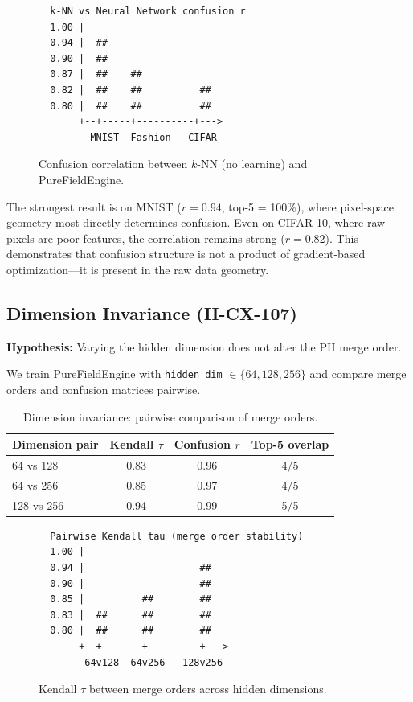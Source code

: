 \documentclass[11pt,a4paper]{article}
\begin{document}
\begin{figure}[htbp]
\centering
\begin{verbatim}
  k-NN vs Neural Network confusion r
  1.00 |
  0.94 |  ##
  0.90 |  ##
  0.87 |  ##    ##
  0.82 |  ##    ##          ##
  0.80 |  ##    ##          ##
       +--+-----+----------+--->
         MNIST  Fashion   CIFAR
\end{verbatim}
\caption{Confusion correlation between $k$-NN (no learning) and PureFieldEngine.}
\label{fig:algo-invariance}
\end{figure}

The strongest result is on MNIST ($r = 0.94$, top-5 = 100\%), where pixel-space geometry most directly determines confusion. Even on CIFAR-10, where raw pixels are poor features, the correlation remains strong ($r = 0.82$). This demonstrates that confusion structure is not a product of gradient-based optimization---it is present in the raw data geometry.

\subsection{Dimension Invariance (H-CX-107)}

\textbf{Hypothesis:} Varying the hidden dimension does not alter the PH merge order.

We train PureFieldEngine with \texttt{hidden\_dim} $\in \{64, 128, 256\}$ and compare merge orders and confusion matrices pairwise.

\begin{table}[htbp]
\centering
\caption{Dimension invariance: pairwise comparison of merge orders.}
\label{tab:dim-invariance}
\begin{tabular}{lccc}
\toprule
Dimension pair & Kendall $\tau$ & Confusion $r$ & Top-5 overlap \\
\midrule
64 vs 128  & 0.83 & 0.96 & 4/5 \\
64 vs 256  & 0.85 & 0.97 & 4/5 \\
128 vs 256 & 0.94 & 0.99 & 5/5 \\
\bottomrule
\end{tabular}
\end{table}

\begin{figure}[htbp]
\centering
\begin{verbatim}
  Pairwise Kendall tau (merge order stability)
  1.00 |
  0.94 |                    ##
  0.90 |                    ##
  0.85 |          ##        ##
  0.83 |  ##      ##        ##
  0.80 |  ##      ##        ##
       +--+-------+---------+--->
        64v128  64v256   128v256
\end{verbatim}
\caption{Kendall $\tau$ between merge orders across hidden dimensions.}
\label{fig:dim-invariance}
\end{figure}
\end{document}
